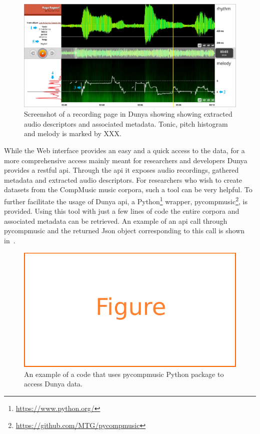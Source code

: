 \begin{figure}
	\begin{center}
		\includegraphics[width=\figSizeHundred]{ch08_applications/figures/dunyaScreenshot.pdf}
		\end{center}
		\caption{Screenshot of a recording page in Dunya showing showing extracted audio descriptors and associated metadata. Tonic, pitch histogram and melody is marked by XXX.}
		\label{fig:dunya_recording}
\end{figure}

While the Web interface provides an easy and a quick access to the data, for a more comprehensive access mainly meant for researchers and developers Dunya provides a restful \gls{api}. Through the \gls{api} it exposes audio recordings, gathered metadata and extracted audio descriptors. For researchers who wish to create datasets from the CompMusic music corpora, such a tool can be very helpful. To further facilitate the usage of Dunya \gls{api}, a Python\footnote{\url{https://www.python.org/}} wrapper, \gls{pycompmusic}\footnote{\url{https://github.com/MTG/pycompmusic}}, is provided. Using this tool with just a few lines of code the entire corpora and associated metadata can be retrieved. An example of an \gls{api} call through \gls{pycompmusic} and the returned Json object corresponding to this call is shown in~.  

\begin{figure}
	\begin{center}
		\includegraphics[width=\figSizeHundred]{ch08_applications/figures/figure_todo.pdf}
	\end{center}
	\caption{An example of a code that uses \gls{pycompmusic} Python package to access Dunya data.}
	\label{fig:api_call_example}
\end{figure}

